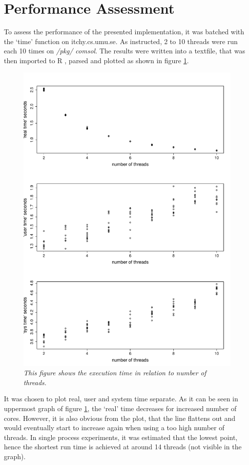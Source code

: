 \documentclass[a4paper,11pt,twoside]{article}
\begin{document}
\section{Performance Assessment}
To assess the performance of the presented implementation, it was
batched with the `time' function on itchy.cs.umu.se. As instructed, 2
to 10 threads were run each 10 times on \textit{/pkg/ comsol}. The
results were written into a textfile, that was then imported to R
\cite{rlanguage}, parsed and plotted as shown in figure
\ref{fig:perform}. 
 
\begin{figure}
\centering
\includegraphics[width=\textwidth]{perform.pdf}
\caption{\textit{This figure shows the execution time in relation to number of threads.}}
\label{fig:perform}
\end{figure}

It was chosen to plot real, user and system time separate. As it can
be seen in uppermost graph of figure \ref{fig:perform}, the `real'
time decreases for increased number of cores. However, it is also
obvious from the plot, that the line flattens out and would eventually
start to increase again when using a too high number of threads. In
single process experiments, it was estimated that the lowest point,
hence the shortest run time is achieved at around 14 threads (not
visible in the graph).
\end{document}
